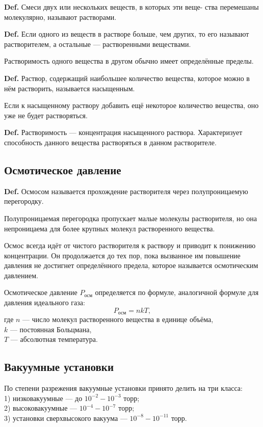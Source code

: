\documentclass[a4paper,12pt]{article} %
\begin{document}
\textbf{Def.} Смеси двух или нескольких веществ, в которых эти веще- ства перемешаны молекулярно, называют растворами.

\textbf{Def.} Если одного из веществ в растворе больше, чем других, то его называют растворителем, а остальные — растворенными веществами.

Растворимость одного вещества в другом обычно имеет определённые пределы. 

\textbf{Def.} Раствор, содержащий наибольшее количество вещества, которое можно в нём растворить, называется насыщенным. 

Если к насыщенному раствору добавить ещё некоторое количество вещества, оно уже не будет растворяться. 

\textbf{Def.} Растворимость — концентрация насыщенного раствора. Характеризует способность данного вещества растворяться в данном растворителе. 

\subsection*{Осмотическое давление}

\textbf{Def.} Осмосом называется прохождение растворителя через полупроницаемую перегородку. 

Полупроницаемая перегородка пропускает малые молекулы растворителя, но она непроницаема для более крупных молекул растворенного вещества. 

Осмос всегда идёт от чистого растворителя к раствору и приводит к понижению концентрации. Он продолжается до тех пор, пока вызванное им повышение давления не достигнет определённого предела, которое называется осмотическим давлением.

Осмотическое давление $P_{\text{осм}}$ определяется по формуле, аналогичной формуле для давления идеального газа:
\begin{equation}
  P_{\text{осм}} = nkT,
\end{equation}
где $n$ — число молекул растворенного вещества в единице объёма, \\
$k$ — постоянная Больцмана, \\
$T$ — абсолютная температура.

\subsection*{Вакуумные установки}

По степени разрежения вакуумные установки принято делить на три класса: \\
1) низковакуумные — до $10^{-2}-10^{-3}$ торр; \\ 
2) высоковакуумные — $10^{-4}-10^{-7}$ торр; \\ 
3) установки сверхвысокого вакуума — $10^{-8}-10^{-11}$ торр.
\end{document}
